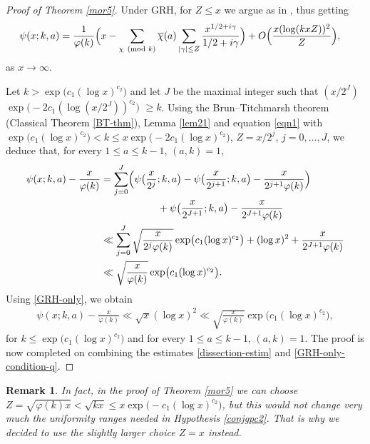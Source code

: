\documentclass[pdflatex]{sn-jnl}%
\theoremstyle{sltheorems}
\theoremstyle{plainrem}
\newtheorem{Rem}{Remark}
\theoremstyle{definition}
\begin{document}
\begin{proof}[Proof of Theorem \ref{mor5}]

Under GRH, for $Z\le  x$ we argue as in \cite[eq. (58)]{mathannalen},
thus getting 
%
\begin{align}\label{eqn1}
   \psi(x;k,a) 
   & = \frac{1}{\varphi(k)} 
   \Bigl( x -
\sum_{\substack{  \chi 
\pmod{k}}} \overline{\chi}(a) \sum_{\substack{ \vert \gamma \vert  \le  Z 
}} \frac{x^{1/2 + i\gamma}}{1/2 + i\gamma} \Bigr) 
+ 
O\Bigl(
\frac{x (\log (kxZ))^2}{Z}
\Bigr),
   \end{align}
as $x \to \infty.$

 Let $k > \exp\bigl(c_1(\log x)^{c_2}\bigr)$
and let $J$ be the maximal integer such that
$(x/2^J)$ $\exp\bigl(-2c_1(\log (x/2^J))^{c_2}\bigr)$ $ \ge  k$.
%
Using  the Brun--Titchmarsh theorem (Classical Theorem \ref{BT-thm}), 
Lemma \ref{lem21} and equation \eqref{eqn1} with 
$ \exp\bigl(c_1(\log x)^{c_2}\bigr) 
< k\le x \exp\bigl(-2c_1(\log x)^{c_2}\bigr)$, 
$Z = x/2^j
$,
$j=0,\dotsc, J$, we deduce that, for every $1\le a \le k-1$, $(a,k)=1$,
%
\begin{align}\notag
\psi(x;k,a)- \frac{x}{\varphi(k)}
&= \sum_{j=0}^{J} \Bigl(
\psi\bigl(\frac{x}{2^j};k,a\bigr)
- 
\psi\bigl(\frac{x}{2^{j+1}};k,a\bigr) - \frac{x}{2^{j+1} \varphi(k)}
\Bigr) 
\\&\hskip2cm
\nonumber
+
\psi\bigl(\frac{x}{2^{J+1}};k,a\bigr) - \frac{x}{2^{J+1} \varphi(k)}
\\ \nonumber
& \ll
\sum_{j=0}^{J} 
\sqrt{\frac{x}{2^j {\varphi(k)}}}  \exp\bigl(c_1(\log x)^{c_2}\bigr) + (\log x)^2 +
\frac{x}{2^{J+1} \varphi(k)} \\
\label{dissection-estim}
& \ll \sqrt{\frac{x}{{\varphi(k)}}} 
\exp\bigl(c_1(\log x)^{c_2}\bigr).
\end{align}
Using \eqref{GRH-only}, we obtain
\begin{align}\label{GRH-only-condition-q}
\psi(x;k,a)- \frac{x}{\varphi(k)}
\ll \sqrt{x} (\log x)^2
\ll
\sqrt{\frac{x}{{\varphi(k)}}} \exp\bigl(c_1(\log x)^{c_2}\bigr),
 \end{align}
 for $k \le \exp\bigl(c_1(\log x)^{c_2}\bigr)$ and for every $1\le a \le k-1$, $(a,k)=1$.
The proof is now completed on combining the estimates \eqref{dissection-estim} and \eqref{GRH-only-condition-q}.
\end{proof}

\begin{Rem}
In fact, in the proof of Theorem \ref{mor5} we can choose 
$Z=\sqrt{\varphi(k)x}<\sqrt{kx}\le x \exp\bigl(-c_1(\log x)^{c_2}\bigr)$,
but this would not change very much the uniformity ranges needed
in Hypothesis \ref{conjgpc2}. That is why we decided to use the slightly larger choice $Z=x$
instead.
\end{Rem}
\end{document}
